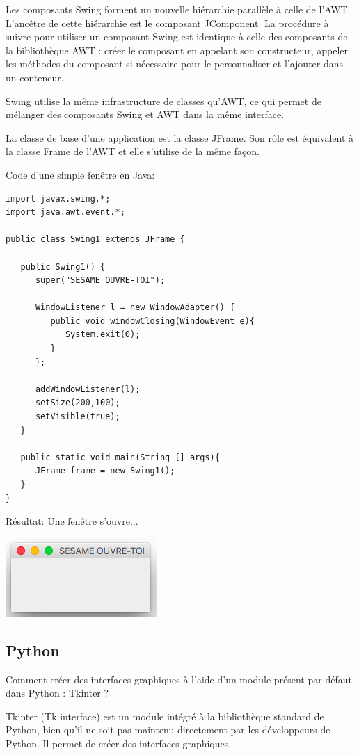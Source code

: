 \documentclass{article}
\begin{document}
Les composants Swing forment un nouvelle hiérarchie parallèle à celle de l'AWT. L'ancêtre de cette hiérarchie est le composant JComponent.
La procédure à suivre pour utiliser un composant Swing est identique à celle des composants de la bibliothèque AWT : créer le composant en appelant son constructeur, appeler les méthodes du composant si nécessaire pour le personnaliser et l'ajouter dans un conteneur.

Swing utilise la même infrastructure de classes qu'AWT, ce qui permet de mélanger des composants Swing et AWT dans la même interface.

La classe de base d'une application est la classe JFrame. Son rôle est équivalent à la classe Frame de l'AWT et elle s'utilise de la même façon. 

Code d'une simple fenêtre en Java:
\begin{verbatim}
import javax.swing.*;
import java.awt.event.*;

public class Swing1 extends JFrame {

   public Swing1() {
      super("SESAME OUVRE-TOI");

      WindowListener l = new WindowAdapter() {
         public void windowClosing(WindowEvent e){
            System.exit(0);
         }
      };

      addWindowListener(l);
      setSize(200,100);
      setVisible(true);
   }

   public static void main(String [] args){
      JFrame frame = new Swing1();
   }
}
\end{verbatim}

Résultat: Une fenêtre s'ouvre...
\begin{center}
  \includegraphics[scale=0.5]{fenetreJ.png}
\end{center}

\subsection{Python}

Comment créer des interfaces graphiques à l'aide d'un module présent par défaut dans Python : Tkinter ?

Tkinter (Tk interface) est un module intégré à la bibliothèque standard de Python, bien qu'il ne soit pas maintenu directement par les développeurs de Python. Il permet de créer des interfaces graphiques.
\end{document}
